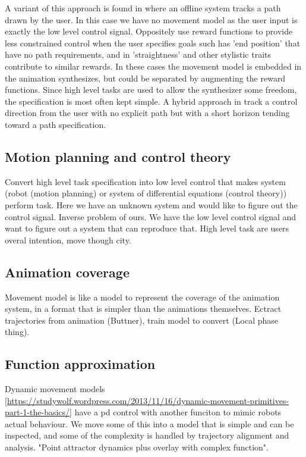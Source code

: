 A variant of this approach is found in \citep{treuille07} where an offline system tracks a path drawn by the user. In this case we have no movement model as the user input is exactly the low level control signal. Oppositely \citep{kovar02} use reward functions to provide less constrained control when the user specifies goals such has 'end position' that have no path requirements, and in \citep{lee18} 'straightness' and other stylistic traits contribute to similar rewards. In these cases the movement model is embedded in the animation synthesizes, but could be separated by augmenting the reward functions. Since high level tasks are used to allow the synthesizer some freedom, the specification is most often kept simple. A hybrid approach in \citep{lee10} track a control direction from the user with no explicit path but with a short horizon tending toward a path specification.

\subsection{Motion planning and control theory}
Convert high level task specification into low level control that makes system (robot (motion planning) or system of differential equations (control theory)) perform task.
Here we have an unknown system and would like to figure out the control signal. Inverse problem of ours. We have the low level control signal and want to figure out a system that can reproduce that. High level task are users overal intention, move though city.

\subsection{Animation coverage}
Movement model is like a model to represent the coverage of the animation system, in a format that is simpler than the animations themselves. Ectract trajectories from animation (Buttner), train model to convert (Local phase thing). 

\subsection{Function approximation}

Dynamic movement models \ref{https://studywolf.wordpress.com/2013/11/16/dynamic-movement-primitives-part-1-the-basics/} have a pd control with another funciton to mimic robots actual behaviour. We move some of this into a model that is simple and can be inspected, and some of the complexity is handled by trajectory alignment and analysis. "Point attractor dynamics plus overlay with complex function".

